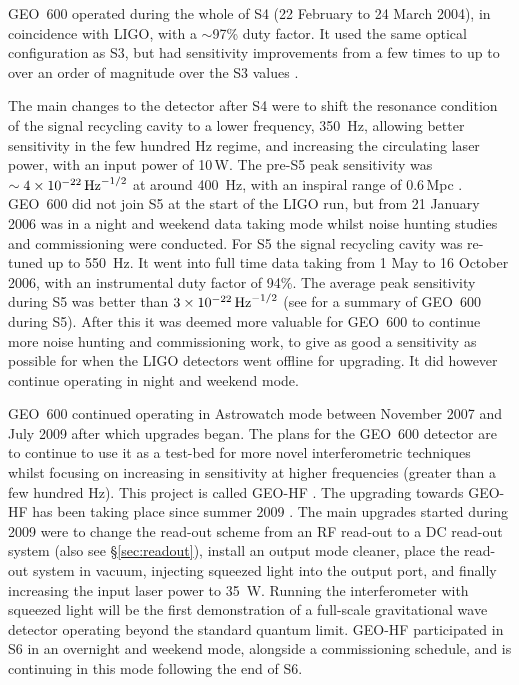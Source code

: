 \documentclass{article}
\begin{document}
GEO~600 operated during the whole of S4 (22 February to 24 March 2004), in
coincidence with LIGO, with a $\sim$97\% duty factor. It used the same optical
configuration as S3, but had sensitivity improvements from a few times to up
to over an order of magnitude over the S3 values \cite{Hild:2006a}.

The main changes to the detector after S4 were to shift the resonance condition
of the signal recycling cavity to a lower frequency, 350~Hz, allowing better
sensitivity in the few hundred Hz regime, and increasing the circulating laser
power, with an input power of 10\,W. The pre-S5 peak sensitivity was
$\sim4\times10^{-22}\,{\rm Hz}^{-1/2}$ at around 400~Hz, with an inspiral
range of 0.6\,Mpc \cite{Hild:2006b}. GEO~600 did not join S5 at the start of the
LIGO run, but from 21 January 2006 was in a night and weekend data taking mode
whilst noise hunting studies and commissioning were conducted. For S5 the signal
recycling cavity was re-tuned up to 550~Hz. It went into full time data taking
from 1 May to 16 October 2006, with an instrumental duty factor of 94\%. The
average peak sensitivity during S5 was better than $3\times10^{-22}\,{\rm
Hz}^{-1/2}$ (see \cite{Willke:2007} for a summary of GEO~600 during S5). After
this it was deemed more valuable for GEO~600 to continue more noise hunting and
commissioning work, to give as good a sensitivity as possible for when the LIGO
detectors went offline for upgrading. It did however continue operating in night
and weekend mode. 

GEO~600  continued operating in Astrowatch mode between November 2007 and July
2009 after which upgrades began. The plans for the GEO~600 detector are to 
continue to use it as a test-bed for more novel interferometric techniques
whilst focusing on increasing in sensitivity at higher frequencies (greater than
a few hundred Hz). This project is called GEO-HF \cite{Willke:2006}. The
upgrading towards GEO-HF has been taking place since summer 2009
\cite{Grote:2010}. The main upgrades started during 2009 were to change the
read-out scheme from an RF read-out to a DC read-out system \cite{Hild:2008}
(also see \S\ref{sec:readout}), install an output mode cleaner, place the
read-out system in vacuum, injecting squeezed light \cite{Vahlbruch:2008,
Chelkowski:2007} into the output port, and finally increasing the input laser
power to 35~W. Running the interferometer with squeezed light will be the first
demonstration of a full-scale gravitational wave detector operating beyond the
standard quantum limit. GEO-HF participated in S6 in an overnight and weekend
mode, alongside a commissioning schedule, and is continuing in this mode
following the end of S6.
\end{document}
